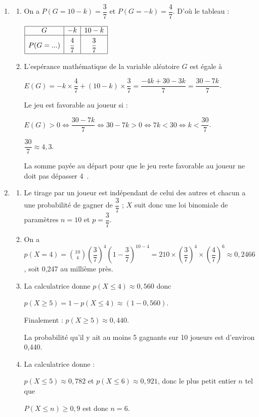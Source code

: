 \documentclass[10pt]{article}
\providecommand{\euro}{\texteuro}
\providecommand{\np}[2][]{{#2~#1}}
\providecommand{\euro}{{\text{€}}}
\renewcommand{\euro}{\ifmmode\text{\texteuro}\else\texteuro\fi}
\begin{document}
\begin{enumerate}[resume]
\item 





	\begin{enumerate}
		\item 
On a $P(G = 10 - k) = \dfrac{3}{7}$ et $P(G = -k) = \dfrac{4}{7}$. D'où le tableau :

\begin{center}
$\begin{array}{|*{3}{c|}}\hline
G				&- k			&10 - k\\ \hline
P(G = ...)		&\dfrac{4}{7}	&\dfrac{3}{7}\rule[-3mm]{0mm}{9mm}\\ \hline
\end{array}$
\end{center}
		\item 
L'espérance mathématique de la variable aléatoire $G$ est égale à 
		
$E(G) = - k \times \dfrac{4}{7} + (10 - k) \times \dfrac{3}{7} = \dfrac{-4k + 30 - 3k}{7} = \dfrac{30 - 7k}{7}$.

Le jeu est favorable au joueur si :

$E(G) > 0 \iff \dfrac{30 - 7k}{7} \iff 30 - 7k > 0 \iff 7k < 30 \iff k < \dfrac{30}{7}$.

$\dfrac{30}{7} \approx 4,3$.

La somme payée au départ pour que le jeu reste favorable au joueur ne doit pas dépasser 4~\euro.	
	\end{enumerate}
\item 


	\begin{enumerate}
		\item 
Le tirage par un joueur est indépendant de celui des autres et chacun a une probabilité de gagner de $\dfrac{3}{7}$ ; $X$ suit donc une loi binomiale de paramètres $n = 10$ et $p = \dfrac{3}{7}$.
		\item 
On a $p(X = 4) = \binom{10}{4}\left(\dfrac{3}{7}\right)^4\left( 1 - \dfrac{3}{7}  \right)^{10-4} = 210 \times\left(\dfrac{3}{7}\right)^4 \times \left(\dfrac{4}{7}\right)^6 \approx \np{0,2466}$, soit 0,247 au millième près.
		\item  
La calculatrice donne $p(X\leqslant 4) \approx 0,560$ donc 

$p(X\geqslant 5) = 1 - p(X\leqslant 4) \approx (1 - 0,560)$.

Finalement : $p(X\geqslant 5) \approx 0,440$.
		
La probabilité qu'il y ait au moins 5 gagnants sur 10 joueurs est d'environ 0,440.
		\item 
La calculatrice donne :
		
$p(X \leqslant 5) \approx 0,782$ et $p(X \leqslant 6) \approx 0,921$, donc 
le plus petit entier $n$ tel que 

$P(X \leqslant n) \geqslant 0,9$ est donc $n = 6$.
	\end{enumerate}
\end{enumerate}


\medskip
\end{document}
